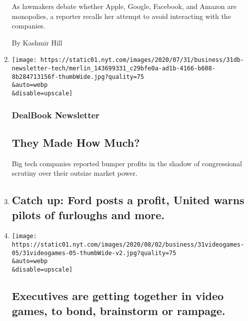 \begin{enumerate}
  As lawmakers debate whether Apple, Google, Facebook, and Amazon are
  monopolies, a reporter recalls her attempt to avoid interacting with
  the companies.

  By Kashmir Hill
\item
  \href{/2020/07/31/business/dealbook/tech-earnings-economy.html}{}

  \texttt{[image: https://static01.nyt.com/images/2020/07/31/business/31db-newsletter-tech/merlin\_143699331\_c29bfe0a-ad1b-4166-b608-8b284713156f-thumbWide.jpg?quality=75\\\&auto=webp\\\&disable=upscale]}

  \hypertarget{dealbook-newsletter}{%
  \subsubsection{DealBook Newsletter}\label{dealbook-newsletter}}

  \hypertarget{they-made-how-much}{%
  \subsection{They Made How Much?}\label{they-made-how-much}}

  Big tech companies reported bumper profits in the shadow of
  congressional scrutiny over their outsize market power.
\item
  \href{/2020/07/31/business/catch-up-ford-posts-a-profit-united-warns-pilots-of-furloughs-and-more.html}{}

  \hypertarget{catch-up-ford-posts-a-profit-united-warns-pilots-of-furloughs-and-more}{%
  \subsection{Catch up: Ford posts a profit, United warns pilots of
  furloughs and
  more.}\label{catch-up-ford-posts-a-profit-united-warns-pilots-of-furloughs-and-more}}
\item
  \href{/2020/07/31/business/executives-are-getting-together-in-video-games-to-bond-brainstorm-or-rampage.html}{}

  \texttt{[image: https://static01.nyt.com/images/2020/08/02/business/31videogames-05/31videogames-05-thumbWide-v2.jpg?quality=75\\\&auto=webp\\\&disable=upscale]}

  \hypertarget{executives-are-getting-together-in-video-games-to-bond-brainstorm-or-rampage}{%
  \subsection{Executives are getting together in video games, to bond,
  brainstorm or
  rampage.}\label{executives-are-getting-together-in-video-games-to-bond-brainstorm-or-rampage}}


\end{enumerate}

